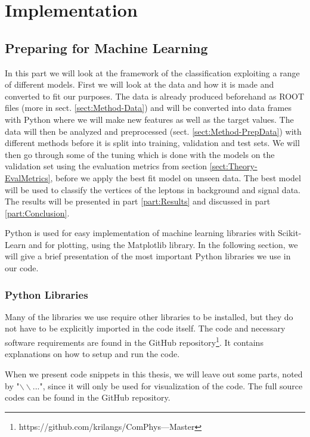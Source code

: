 \documentclass[a4paper, american, 12pt]{report}
\begin{document}

	\part{Implementation}
	\label{part:Implementation}
	
	\chapter{Preparing for Machine Learning}
	\label{chap:Method-Methods}
	In this part we will look at the framework of the classification exploiting a range of different models. First we will look at the data and how it is made and converted to fit our purposes. The data is already produced beforehand as ROOT files (more in sect. \ref{sect:Method-Data}) and will be converted into data frames with Python where we will make new features as well as the target values. The data will then be analyzed and preprocessed (sect. \ref{sect:Method-PrepData}) with different methods before it is split into training, validation and test sets. We will then go through some of the tuning which is done with the models on the validation set using the evaluation metrics from section \ref{sect:Theory-EvalMetrics}, before we apply the best fit model on unseen data. The best model will be used to classify the vertices of the leptons in background and signal data. The results will be presented in part \ref{part:Results} and discussed in part \ref{part:Conclusion}.
	
	Python is used for easy implementation of machine learning libraries with Scikit-Learn and for plotting, using the Matplotlib library. In the following section, we will give a brief presentation of the most important Python libraries we use in our code.
	
	
	\section{Python Libraries}
	\label{sect:Method-Packages}
	Many of the libraries we use require other libraries to be installed, but they do not have to be explicitly imported in the code itself. The code and necessary software requirements are found in the GitHub repository\footnote{https://github.com/krilangs/ComPhys---Master}. It contains explanations on how to setup and run the code.
	
	When we present code snippets in this thesis, we will leave out some parts, noted by "$\backslash\backslash$...", since it will only be used for visualization of the code. The full source codes can be found in the GitHub repository. 
	
\end{document}
